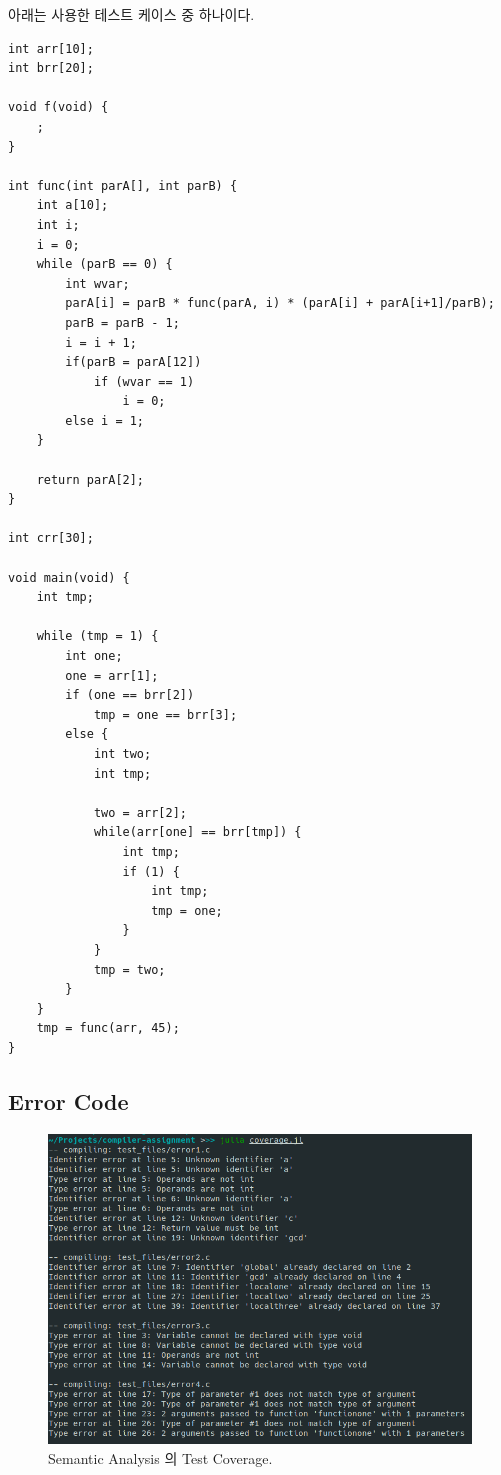 \documentclass[a4paper, 12p]{paper}
\begin{document}
아래는 사용한 테스트 케이스 중 하나이다.
\begin{verbatim}
int arr[10];
int brr[20];

void f(void) {
    ;
}

int func(int parA[], int parB) {
    int a[10];
    int i;
    i = 0;
    while (parB == 0) {
        int wvar;
        parA[i] = parB * func(parA, i) * (parA[i] + parA[i+1]/parB);
        parB = parB - 1;
        i = i + 1;
        if(parB = parA[12])
            if (wvar == 1)
                i = 0;
        else i = 1;
    }

    return parA[2];
}

int crr[30];

void main(void) {
    int tmp;

    while (tmp = 1) {
        int one;
        one = arr[1];
        if (one == brr[2])
            tmp = one == brr[3];
        else {
            int two;
            int tmp;

            two = arr[2];
            while(arr[one] == brr[tmp]) {
                int tmp;
                if (1) {
                    int tmp;
                    tmp = one;
                }
            }
            tmp = two;
        }
    }
    tmp = func(arr, 45);
}
\end{verbatim}


\subsection{Error Code}
\begin{figure}[H]
  \centering
\includegraphics[scale=0.5]{figs/coverage.png}
\caption{Semantic Analysis 의 Test Coverage.}\label{fig:coverage}
\end{figure}
\end{document}
